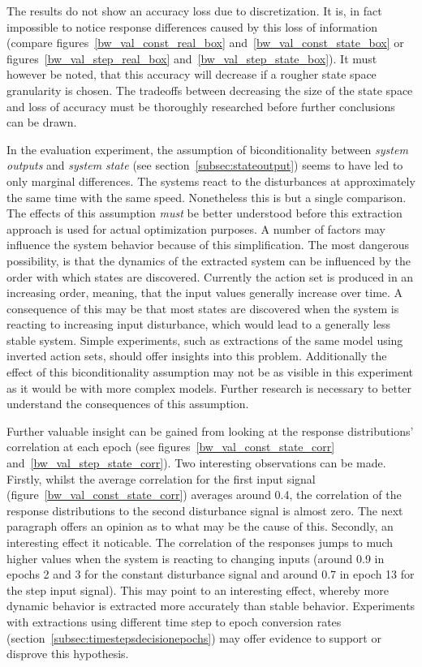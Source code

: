 The results do not show an accuracy loss due to discretization. It is, in fact impossible to notice response differences caused by this loss of information (compare figures~\ref{bw_val_const_real_box} and~\ref{bw_val_const_state_box} or figures~\ref{bw_val_step_real_box} and~\ref{bw_val_step_state_box}). It must however be noted, that this accuracy will decrease if a rougher state space granularity is chosen. The tradeoffs between decreasing the size of the state space and loss of accuracy must be thoroughly researched before further conclusions can be drawn.

In the evaluation experiment, the assumption of biconditionality between \textit{system outputs} and \textit{system state} (see section~\ref{subsec:stateoutput}) seems to have led to only marginal differences. The systems react to the disturbances at approximately the same time with the same speed. Nonetheless this is but a single comparison. The effects of this assumption \textit{must} be better understood before this extraction approach is used for actual optimization purposes. A number of factors may influence the system behavior because of this simplification. The most dangerous possibility, is that the dynamics of the extracted system can be influenced by the order with which states are discovered. Currently the action set is produced in an increasing order, meaning, that the input values generally increase over time. A consequence of this may be that most states are discovered when the system is reacting to increasing input disturbance, which would lead to a generally less stable system. Simple experiments, such as extractions of the same model using inverted action sets, should offer insights into this problem. Additionally the effect of this biconditionality assumption may not be as visible in this experiment as it would be with more complex models. Further research is necessary to better understand the consequences of this assumption.

Further valuable insight can be gained from looking at the response distributions' correlation at each epoch (see figures~\ref{bw_val_const_state_corr} and~\ref{bw_val_step_state_corr}). Two interesting observations can be made. Firstly, whilst the average correlation for the first input signal (figure~\ref{bw_val_const_state_corr}) averages around 0.4, the correlation of the response distributions to the second disturbance signal is almost zero. The next paragraph offers an opinion as to what may be the cause of this. Secondly, an interesting effect it noticable. The correlation of the responses jumps to much higher values when the system is reacting to changing inputs (around 0.9 in epochs 2 and 3 for the constant disturbance signal and around 0.7 in epoch 13 for the step input signal). This may point to an interesting effect, whereby more dynamic behavior is extracted more accurately than stable behavior. Experiments with extractions using different time step to epoch conversion rates (section~\ref{subsec:timestepsdecisionepochs}) may offer evidence to support or disprove this hypothesis.

